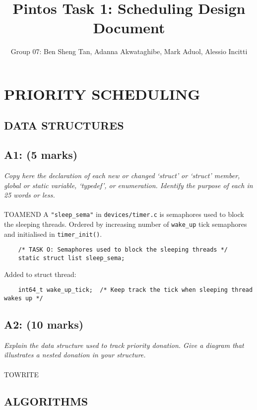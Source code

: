 \documentclass{article}
\title{Pintos Task 1: Scheduling Design Document}
\author{Group 07: Ben Sheng Tan, Adanna Akwataghibe, Mark Aduol, Alessio Incitti }
\begin{document}
\maketitle

\section{PRIORITY SCHEDULING}

\subsection{ DATA STRUCTURES}

\subsection*{A1: (5 marks) }

\textit{Copy here the declaration of each new or changed ‘struct’ or ‘struct’ member, global or static variable, ‘typedef’, or enumeration. Identify the purpose of each in 25 words or less.}
\\ \\
TOAMEND
A \texttt{"sleep\_sema"} in \texttt{devices/timer.c} is semaphores used to block the sleeping threads. Ordered by increasing number of \texttt{wake\_up} tick semaphores and initialised in \texttt{timer\_init()}.

\begin{lstlisting}
    /* TASK O: Semaphores used to block the sleeping threads */
    static struct list sleep_sema;
\end{lstlisting}
\hfill \break
Added to struct thread:

\begin{lstlisting}
    int64_t wake_up_tick;  /* Keep track the tick when sleeping thread wakes up */
\end{lstlisting}


\subsection*{A2: (10 marks) }

\textit{Explain the data structure used to track priority donation. Give a diagram that illustrates a nested donation in your structure.}
\\ \\
TOWRITE

\subsection{ALGORITHMS}
\end{document}
